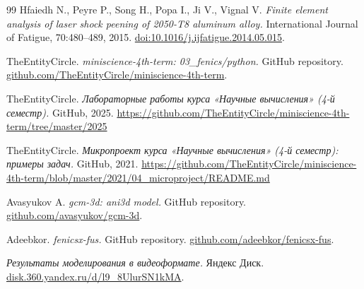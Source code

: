 \begin{thebibliography}{99}
  Hfaiedh N., Peyre P., Song H., Popa I., Ji V., Vignal V.
  \textit{Finite element analysis of laser shock peening of 2050-T8 aluminum alloy.}
  International Journal of Fatigue, 70:480--489, 2015.
  \href{https://doi.org/10.1016/j.ijfatigue.2014.05.015}{doi:10.1016/j.ijfatigue.2014.05.015}.

  TheEntityCircle.
  \textit{miniscience-4th-term: 03\_fenics/python.}
  GitHub repository.
  \href{https://github.com/TheEntityCircle/miniscience-4th-term/tree/master/2025/03_fenics/python}{github.com/TheEntityCircle/miniscience-4th-term}.

  TheEntityCircle.
  \textit{Лабораторные работы курса «Научные вычисления» (4-й семестр).}
  GitHub, 2025.
  \url{https://github.com/TheEntityCircle/miniscience-4th-term/tree/master/2025}

  TheEntityCircle.
  \textit{Микропроект курса «Научные вычисления» (4-й семестр): примеры задач.}
  GitHub, 2021.
  \url{https://github.com/TheEntityCircle/miniscience-4th-term/blob/master/2021/04_microproject/README.md}

  Avasyukov A.
  \textit{gcm-3d: ani3d model.}
  GitHub repository.
  \href{https://github.com/avasyukov/gcm-3d/tree/markered-corpse/models/ani3d}{github.com/avasyukov/gcm-3d}.

  Adeebkor.
  \textit{fenicsx-fus.}
  GitHub repository.
  \href{https://github.com/adeebkor/fenicsx-fus}{github.com/adeebkor/fenicsx-fus}.

  \textit{Результаты моделирования в видеоформате.}
  Яндекс Диск.
  \href{https://disk.360.yandex.ru/d/l9_8UlurSN1kMA}{disk.360.yandex.ru/d/l9\_8UlurSN1kMA}.

\end{thebibliography}
